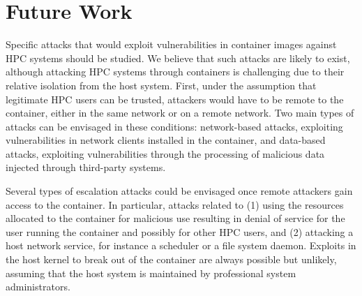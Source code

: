 \section{Future Work}

Specific attacks that would exploit vulnerabilities in container images 
against HPC systems should be studied. We
believe that such attacks are likely to exist, although attacking HPC
systems through containers is challenging due to their relative isolation
from the host system. First, under the assumption that legitimate HPC
users can be trusted, attackers would have to be remote to the container,
either in the same network or on a remote network. Two main types of
attacks can be envisaged in these conditions: network-based attacks,
exploiting vulnerabilities in network clients installed in the container,
and data-based attacks, exploiting vulnerabilities through the processing
of malicious data injected through third-party systems.

Several types of escalation attacks could be envisaged once remote
attackers gain access to the container. In particular, attacks related
to (1) using the resources allocated to the container for malicious use resulting in denial of service
for the user running the container and possibly for other HPC users, and
(2) attacking a host network service, for instance a scheduler or a file
system daemon. 
Exploits in the host kernel to break out of the container
are always possible but unlikely, assuming that the host system is
maintained by professional system administrators.

